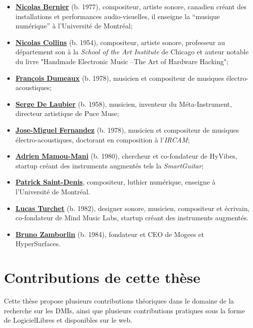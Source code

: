 \vspace{-1em}
\begin{itemize}[noitemsep]
\item \textbf{\hyperref[appendix:bernier]{Nicolas Bernier}} (b. 1977), compositeur, artiste sonore, canadien créant des installations et performances audio-visuelles, il enseigne la ``musique numérique'' à l'Université de Montréal;
\item \textbf{\hyperref[appendix:collins]{Nicolas Collins}} (b. 1954), compositeur, artiste sonore, professeur au département son à la \textit{School of the Art Institute} de Chicago et auteur notable du livre "Handmade Electronic Music –The Art of Hardware Hacking";
\item \textbf{\hyperref[appendix:dumeaux]{François Dumeaux}} (b. 1978), musicien et compositeur de musiques électro-acoustiques;
\item \textbf{\hyperref[appendix:delaubier]{Serge De Laubier}} (b. 1958), musicien, inventeur du Méta-Instrument, directeur artistique de Puce Muse;
\item \textbf{\hyperref[appendix:fernandez]{Jose-Miguel Fernandez}} (b. 1978), musicien et compositeur de musiques électro-acoustiques, doctorant en composition à l'\textit{IRCAM};
\item \textbf{\hyperref[appendix:mamou-mani]{Adrien Mamou-Mani}} (b. 1980), chercheur et co-fondateur de HyVibes, startup créant des instruments augmentés tels la \textit{SmartGuitar};
\item \textbf{\hyperref[appendix:saint-denis]{Patrick Saint-Denis}}, compositeur, luthier numérique, enseigne à l'Université de Montréal.
\item \textbf{\hyperref[appendix:turchet]{Lucas Turchet}} (b. 1982), designer sonore, musicien, compositeur et écrivain, co-fondateur de Mind Music Labs, startup créant des instruments augmentés.
\item \textbf{\hyperref[appendix:zamborlin]{Bruno Zamborlin}} (b. 1984), fondateur et CEO de Mogees et HyperSurfaces. 
\end{itemize}


\section{Contributions de cette thèse}

\noindent Cette thèse propose plusieurs contributions théoriques dans le domaine de la recherche sur les \glspl{DMI}, ainsi que plusieurs contributions pratiques sous la forme de \glspl{LogicielLibre} et disponibles sur le web.

